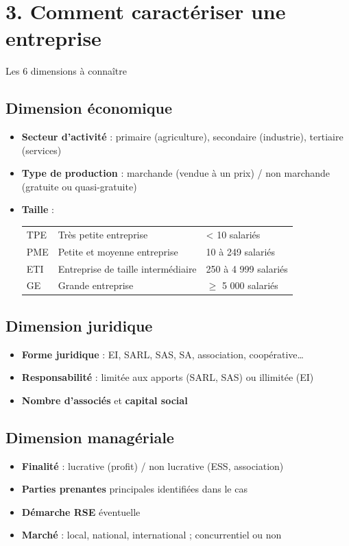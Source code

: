 \documentclass[11pt,a4paper]{article}
\begin{document}
\section*{\textcolor{mainColor}{3. Comment caractériser une entreprise}}

\begin{methbox}{Les 6 dimensions à connaître}

\subsection*{\textcolor{ecoColor}{Dimension économique}}
\begin{itemize}
  \item \textbf{Secteur d'activité} : primaire (agriculture), secondaire (industrie), tertiaire (services)
  \item \textbf{Type de production} : marchande (vendue à un prix) / non marchande (gratuite ou quasi-gratuite)
  \item \textbf{Taille} :
    \begin{tabular}{lll}
      TPE & Très petite entreprise & < 10 salariés \\
      PME & Petite et moyenne entreprise & 10 à 249 salariés \\
      ETI & Entreprise de taille intermédiaire & 250 à 4 999 salariés \\
      GE & Grande entreprise & $\geq$ 5 000 salariés \\
    \end{tabular}
\end{itemize}

\subsection*{\textcolor{droitColor}{Dimension juridique}}
\begin{itemize}
  \item \textbf{Forme juridique} : EI, SARL, SAS, SA, association, coopérative…
  \item \textbf{Responsabilité} : limitée aux apports (SARL, SAS) ou illimitée (EI)
  \item \textbf{Nombre d'associés} et \textbf{capital social}
\end{itemize}

\subsection*{\textcolor{manaColor}{Dimension managériale}}
\begin{itemize}
  \item \textbf{Finalité} : lucrative (profit) / non lucrative (ESS, association)
  \item \textbf{Parties prenantes} principales identifiées dans le cas
  \item \textbf{Démarche RSE} éventuelle
  \item \textbf{Marché} : local, national, international ; concurrentiel ou non
\end{itemize}

\end{methbox}
\end{document}
